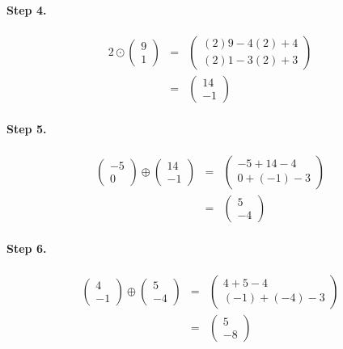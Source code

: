 \documentclass[11pt]{article}
\begin{document}
\paragraph{Step 4.}
\begin{eqnarray*}
2
\odot
\begin{pmatrix}
9\\
1
\end{pmatrix}
&=&
\begin{pmatrix}
(2)9-4(2)+4\\
(2)1-3(2)+3
\end{pmatrix}
\\&=&
\begin{pmatrix}
14\\ 
-1
\end{pmatrix}
\end{eqnarray*}
\paragraph{Step 5.}
\begin{eqnarray*}
\begin{pmatrix}
-5\\
0
\end{pmatrix}
\oplus
\begin{pmatrix}
14\\
-1
\end{pmatrix}
&=&
\begin{pmatrix}
-5+14-4\\
0+(-1)-3
\end{pmatrix}
\\&=&
\begin{pmatrix}
5\\
-4
\end{pmatrix}
\end{eqnarray*}
\paragraph{Step 6.}
\begin{eqnarray*}
\begin{pmatrix}
4\\
-1
\end{pmatrix}
\oplus
\begin{pmatrix}
5\\
-4
\end{pmatrix}
&=&
\begin{pmatrix}
4+5-4\\
(-1)+(-4)-3
\end{pmatrix}
\\&=&
\begin{pmatrix}
5\\
-8
\end{pmatrix}
\end{eqnarray*}
\end{document}
